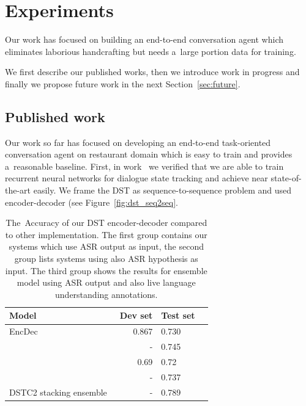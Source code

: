 \documentclass[11pt]{article}
\begin{document}
\section{Experiments}\label{sec:experiments}
Our work has focused on building an end-to-end conversation agent which eliminates laborious handcrafting but needs a~large portion data for training. 

We first describe our published works, then we introduce work in progress and finally we propose future work in the next Section~\ref{sec:future}. 

\subsection{Published work}
Our work so far has focused on developing an end-to-end task-oriented conversation agent on restaurant domain which is easy to train and provides a~reasonable baseline.
First, in work~\cite{platek_recurrent_2016} we verified that we are able to train recurrent neural networks for dialogue state tracking and achieve near state-of-the-art easily. 
We frame the DST as sequence-to-sequence problem and used encoder-decoder (see Figure~\ref{fig:dst_seq2seq}. 

\begin{table}[tb]
\begin{center}
\begin{tabular}{l@{\quad}rll}
\hline
Model & Dev set & Test set\\
[2pt] \hline\rule{0pt}{12pt}
    EncDec  &   0.867 & 0.730 \\
\hline
    \cite{vodolan_hybrid_2015} & - & 0.745 \\
    \cite{zilka_incremental_2015} & 0.69 & 0.72 \\
    \cite{henderson2013deep} & - & 0.737 \\
\hline
    DSTC2 stacking ensemble~\cite{henderson2014second} & - & 0.789 \\
\hline
\end{tabular}
\caption{The~Accuracy of our DST encoder-decoder compared to other implementation. The first group contains our systems which use ASR output as input, the second group lists systems using also ASR hypothesis as input. The third group shows the results for ensemble model using ASR output and also live language understanding annotations.}
\end{center}
\label{tab:dstc}
\end{table}
\end{document}
